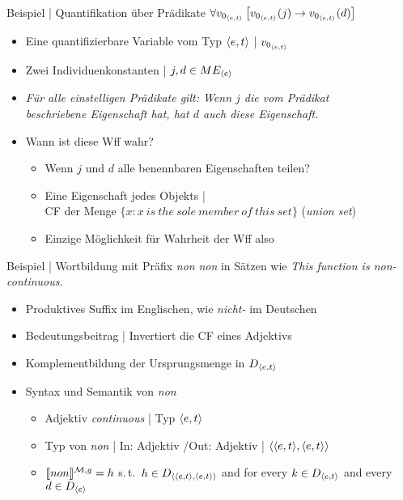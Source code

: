 \begin{frame}
  {Beispiel | Quantifikation über Prädikate}
  \onslide<+->
  \onslide<+->
  \alert{$\forall{}v_{0_{{\langle{}e,t\rangle}}}\left[{}v_{0_{{\langle{}e,t\rangle}}}(j)\rightarrow v_{0_{{\langle{}e,t\rangle}}}(d)\right]$}
  \Halbzeile
  \begin{itemize}[<+->]
    \item Eine quantifizierbare Variable vom Typ ${\langle{}e,t\rangle}$ | \alert{$v_{0_{{\langle{}e,t\rangle}}}$}
    \item Zwei Individuenkonstanten | $j,d\in ME_{{\langle{}e\rangle}}$ 
    \item \textit{Für alle einstelligen Prädikate gilt: Wenn $j$ die vom Prädikat\\
      beschriebene Eigenschaft hat, hat $d$ auch diese Eigenschaft.}
      \Halbzeile
    \item Wann ist diese Wff wahr?
      \begin{itemize}[<+->]
        \item Wenn $j$ und $d$ \alert{alle benennbaren Eigenschaften teilen}?
        \item Eine Eigenschaft jedes Objekts |\\
          \alert{CF der Menge $\{x:x\ is\ the\ sole\ member\ of\ this\ set\}$} (\textit{union set})
        \item Einzige Möglichkeit für Wahrheit der Wff also 
      \end{itemize}
  \end{itemize}
\end{frame}

\begin{frame}
  {Beispiel | Wortbildung mit Präfix \textit{non}}
  \onslide<+->
  \onslide<+->
  \textit{non} in Sätzen wie \textit{This function is \alert{non-continuous}.}\\
  \Halbzeile
  \begin{itemize}[<+->]
    \item Produktives Suffix im Englischen, wie \textit{nicht-} im Deutschen
    \item Bedeutungsbeitrag | \alert{Invertiert die CF} eines Adjektivs
    \item \alert{Komplementbildung} der Ursprungsmenge in $D_{{\langle{}e,t\rangle}}$
      \Halbzeile
    \item Syntax und Semantik von \textit{non}
      \Viertelzeile
      \begin{itemize}[<+->]
        \item Adjektiv \textit{continuous} | Typ ${\langle{}e,t\rangle}$
        \item Typ von \textit{non} | In: Adjektiv \slash Out: Adjektiv | \alert{${\langle{}{\langle{}e,t\rangle},{\langle{}e,t\rangle}\rangle}$}
          \Viertelzeile
        \item $\llbracket{}non\rrbracket^{\mathcal{M},g}=h$ s.\,t.\ \alert{$h\in D_{{\langle{}{\langle{}e,t\rangle},{\langle{}e,t\rangle}\rangle}}$} and for every $k\in{}D_{{\langle{}e,t\rangle}}$ and every $d\in D_{{\langle{}e\rangle}}$\\

      \end{itemize}
  \end{itemize}
\end{frame}

